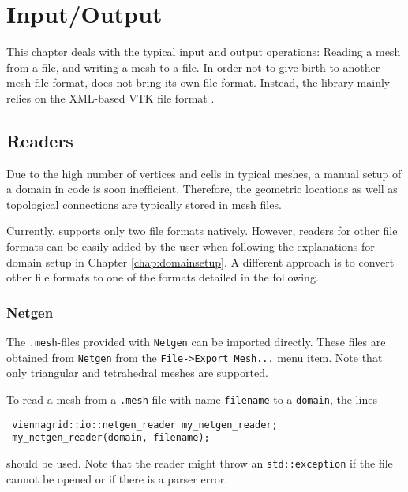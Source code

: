 \chapter{Input/Output} \label{chap:io}
This chapter deals with the typical input and output operations: Reading a mesh from a file, and writing a mesh to a file.
In order not to give birth to another mesh file format, {\ViennaGrid} does not bring its own file format. 
Instead, the library mainly relies on the XML-based VTK \cite{VTK} file format \cite{VTKfileformat}.




\section{Readers}
Due to the high number of vertices and cells in typical meshes,
a manual setup of a domain in code is soon inefficient. Therefore,
the geometric locations as well as topological connections are typically stored in mesh files.

Currently, {\ViennaGrid} supports only two file formats natively. However, readers for other file formats
can be easily added by the user when following the explanations for domain setup in Chapter \ref{chap:domainsetup}.
A different approach is to convert other file formats to one of the formats detailed in the following.


 \subsection{Netgen}
 The \texttt{.mesh}-files provided with \texttt{Netgen} \cite{netgen} can be imported directly.
 These files are obtained from \texttt{Netgen} from the \texttt{File->Export Mesh...} menu item. Note that only triangular and tetrahedral meshes are supported.

 To read a mesh from a \texttt{.mesh} file with name \lstinline|filename| to a \lstinline|domain|, the lines
 \begin{lstlisting}
 viennagrid::io::netgen_reader my_netgen_reader;
 my_netgen_reader(domain, filename);
 \end{lstlisting}
 should be used. Note that the reader might throw an \lstinline|std::exception| if the file cannot be opened or if there is a parser error.

